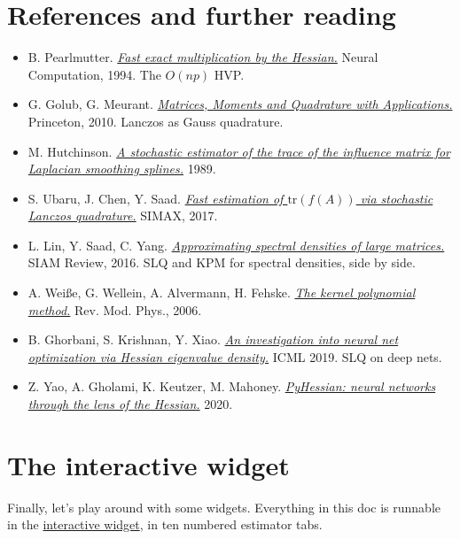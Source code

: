 \documentclass[11pt]{article}
\newcommand{\lab}{\href{https://samyakjainberk.github.io/hessian-spectral/}{interactive widget}}
\begin{document}
\section*{References and further reading}
\begin{itemize}
  \item B. Pearlmutter. \href{https://doi.org/10.1162/neco.1994.6.1.147}{\emph{Fast exact multiplication by the Hessian.}} Neural Computation, 1994. The $O(np)$ HVP.
  \item G. Golub, G. Meurant. \href{https://press.princeton.edu/books/hardcover/9780691143415/matrices-moments-and-quadrature-with-applications}{\emph{Matrices, Moments and Quadrature with Applications.}} Princeton, 2010. Lanczos as Gauss quadrature.
  \item M. Hutchinson. \href{https://doi.org/10.1080/03610918908812806}{\emph{A stochastic estimator of the trace of the influence matrix for Laplacian smoothing splines.}} 1989.
  \item S. Ubaru, J. Chen, Y. Saad. \href{https://doi.org/10.1137/16M1104974}{\emph{Fast estimation of $\mathrm{tr}(f(A))$ via stochastic Lanczos quadrature.}} SIMAX, 2017.
  \item L. Lin, Y. Saad, C. Yang. \href{https://doi.org/10.1137/130934283}{\emph{Approximating spectral densities of large matrices.}} SIAM Review, 2016. SLQ and KPM for spectral densities, side by side.
  \item A. Wei{\ss}e, G. Wellein, A. Alvermann, H. Fehske. \href{https://doi.org/10.1103/RevModPhys.78.275}{\emph{The kernel polynomial method.}} Rev. Mod. Phys., 2006.
  \item B. Ghorbani, S. Krishnan, Y. Xiao. \href{https://arxiv.org/abs/1901.10159}{\emph{An investigation into neural net optimization via Hessian eigenvalue density.}} ICML 2019. SLQ on deep nets.
  \item Z. Yao, A. Gholami, K. Keutzer, M. Mahoney. \href{https://arxiv.org/abs/1912.07145}{\emph{PyHessian: neural networks through the lens of the Hessian.}} 2020.
\end{itemize}

\section{The interactive widget}

Finally, let's play around with some widgets. Everything in this doc is runnable in the \lab{}, in ten numbered estimator tabs.
\end{document}
